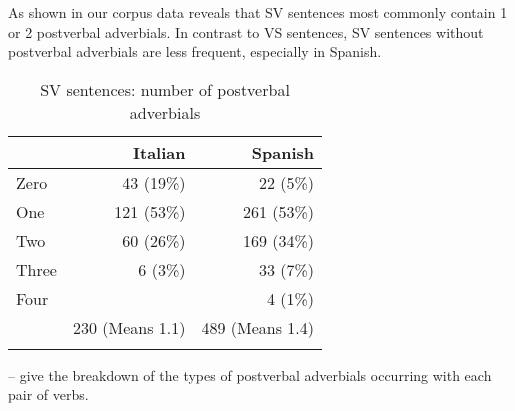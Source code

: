 \documentclass[output=paper,colorlinks,citecolor=brown,
]{langscibook}
\begin{document}
As shown in  our corpus data reveals that SV sentences most commonly contain 1 or 2 postverbal adverbials. In contrast to VS sentences, SV sentences without postverbal adverbials are less frequent, especially in Spanish.  

\begin{table}
    \begin{tabular}{lrr}\lsptoprule
     & Italian & Spanish\\\midrule
     Zero & 43 (19\%) & 22 (5\%)\\
   One & 121 (53\%) & 261 (53\%)\\
   Two & 60 (26\%) & 169 (34\%)\\
   Three & 6 (3\%) & 33 (7\%)\\
   Four & & 4 (1\%)\\
   & 230 (Means 1.1) & 489 (Means 1.4)\\
   \lspbottomrule
    \end{tabular}
    \caption{SV sentences: number of postverbal adverbials}
    \label{tab:nishida:6}
\end{table}

-- give the breakdown of the types of postverbal adverbials occurring with each pair of  verbs.


\begin{figure}

\begin{floatrow}
\quad
{}
\end{floatrow}
\end{figure}

\begin{figure}

\begin{floatrow}
\quad
{}
\end{floatrow}
\end{figure}
\end{document}
